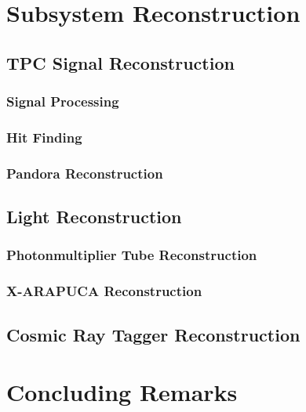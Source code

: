\section{Subsystem Reconstruction}

\subsection{TPC Signal Reconstruction}
\subsubsection{Signal Processing}
\subsubsection{Hit Finding}
\subsubsection{Pandora Reconstruction}

\subsection{Light Reconstruction}
\subsubsection{Photonmultiplier Tube Reconstruction}
\subsubsection{X-ARAPUCA Reconstruction}

\subsection{Cosmic Ray Tagger Reconstruction}


\section{Concluding Remarks}
